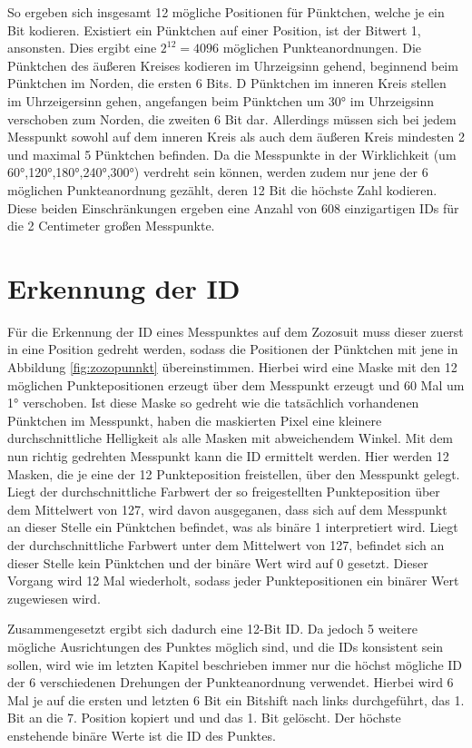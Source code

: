 So ergeben sich insgesamt 12 mögliche Positionen für Pünktchen, welche je ein Bit kodieren. Existiert ein Pünktchen auf einer Position,
ist der Bitwert 1, ansonsten. Dies ergibt eine $2^12=4096$ möglichen Punkteanordnungen. Die Pünktchen des äußeren Kreises kodieren im
Uhrzeigsinn gehend, beginnend beim Pünktchen im Norden, die ersten 6 Bits. D Pünktchen im inneren Kreis stellen im Uhrzeigersinn gehen, angefangen
beim Pünktchen um 30° im Uhrzeigsinn verschoben zum Norden, die zweiten 6 Bit dar. Allerdings müssen sich bei jedem Messpunkt 
sowohl auf dem inneren Kreis als auch dem 
äußeren Kreis mindesten 2 und maximal 5 Pünktchen befinden. Da die Messpunkte in der Wirklichkeit (um 60°,120°,180°,240°,300°) verdreht sein können, werden zudem nur jene der
6 möglichen Punkteanordnung gezählt, deren 12 Bit die höchste Zahl kodieren. Diese beiden Einschränkungen ergeben eine Anzahl von 608 einzigartigen
IDs für die 2 Centimeter großen Messpunkte. \cite{Pina:2018}

\section{Erkennung der ID}

Für die Erkennung der ID eines Messpunktes auf dem Zozosuit muss dieser zuerst in eine Position gedreht werden, sodass die Positionen
der Pünktchen mit jene in Abbildung \ref{fig:zozopunnkt} übereinstimmen. Hierbei wird eine Maske mit den 12 möglichen Punktepositionen
erzeugt über dem Messpunkt erzeugt und 60 Mal um 1° verschoben. Ist diese Maske so gedreht wie die tatsächlich vorhandenen Pünktchen 
im Messpunkt, haben die maskierten Pixel eine kleinere durchschnittliche Helligkeit als alle Masken mit abweichendem Winkel. 
Mit dem nun richtig gedrehten Messpunkt kann die ID ermittelt werden. Hier werden 12 Masken, die je eine der 12 Punkteposition freistellen,
über den Messpunkt gelegt. Liegt der durchschnittliche Farbwert der so freigestellten Punkteposition über dem Mittelwert von 127, wird davon ausgeganen,
dass sich auf dem Messpunkt an dieser Stelle ein Pünktchen befindet, was als binäre 1 interpretiert wird. Liegt der durchschnittliche Farbwert
unter dem Mittelwert von 127, befindet sich an dieser Stelle kein Pünktchen und der binäre Wert wird auf 0 gesetzt. Dieser Vorgang wird 12 Mal wiederholt,
sodass jeder Punktepositionen ein binärer Wert zugewiesen wird. \cite{Pina:2018}

Zusammengesetzt ergibt sich dadurch eine 12-Bit ID. Da jedoch 5 weitere mögliche Ausrichtungen des Punktes möglich sind, und die IDs 
konsistent sein sollen, wird wie im letzten Kapitel beschrieben immer nur die höchst mögliche ID der 6 verschiedenen Drehungen der Punkteanordnung
verwendet. Hierbei wird 6 Mal je auf die ersten und letzten 6 Bit ein Bitshift nach links durchgeführt, das 1. Bit an die 7. Position kopiert und
und das 1. Bit gelöscht. Der höchste enstehende binäre Werte ist die ID des Punktes. \cite{Pina:2018}